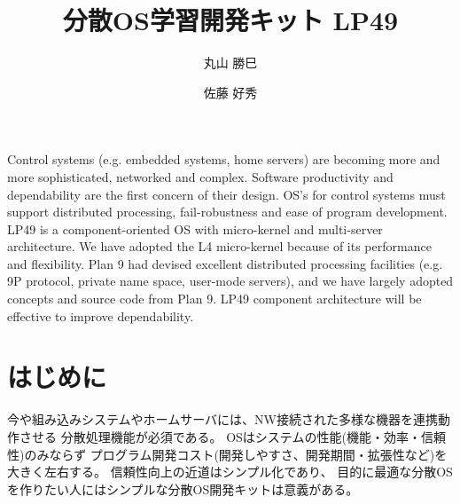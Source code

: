 \documentclass{ipsjpapers}
\begin{document}
\title[分散OS学習開発キット LP49]  %
	{分散OS学習開発キット LP49}

\author{丸山  勝巳\and
	佐藤  好秀}
	

\begin{abstract}

 
\end{abstract}

\begin{eabstract}
  Control systems (e.g. embedded systems, home servers) are becoming more and more sophisticated, 
networked and complex. 
Software productivity and dependability are the first concern of their design. 
OS’s for control systems must support distributed processing, 
fail-robustness and ease of program development. 
LP49 is a component-oriented OS with micro-kernel and multi-server architecture. 
We have adopted the L4 micro-kernel because of its performance and flexibility. 
Plan 9 had devised excellent distributed processing facilities 
(e.g. 9P protocol, private name space, user-mode servers), 
and we have largely adopted concepts and source code from Plan 9. 
LP49 component architecture will be effective to improve dependability.

\end{eabstract}

\maketitle


\section{はじめに}

  今や組み込みシステムやホームサーバには、NW接続された多様な機器を連携動作させる
分散処理機能が必須である。
OSはシステムの性能(機能・効率・信頼性)のみならず
プログラム開発コスト(開発しやすさ、開発期間・拡張性など)を大きく左右する。
信頼性向上の近道はシンプル化であり、
目的に最適な分散OSを作りたい人にはシンプルな分散OS開発キットは意義がある。
\end{document}

